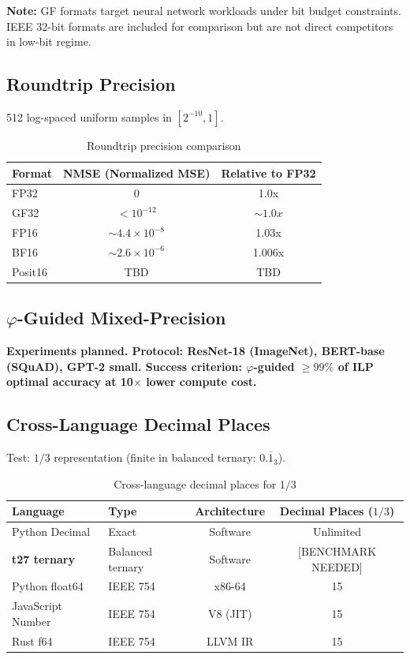 \documentclass{article}
\begin{document}
\textbf{Note:} GF formats target neural network workloads under bit budget constraints. IEEE 32-bit formats are included for comparison but are not direct competitors in low-bit regime.

\subsection{Roundtrip Precision}

512 log-spaced uniform samples in $[2^{-10}, 1]$.

\begin{table}[h]
\centering
\begin{tabular}{lcc}
\toprule
Format & NMSE (Normalized MSE) & Relative to FP32 \\
\midrule
FP32   & 0                    & 1.0x \\
GF32   & $< 10^{-12}$           & $\sim 1.0x$ \\
FP16   & $\sim 4.4 \times 10^{-8}$ & 1.03x \\
BF16   & $\sim 2.6 \times 10^{-6}$ & 1.006x \\
Posit16& TBD & TBD \\
\bottomrule
\end{tabular}
\caption{Roundtrip precision comparison}
\end{table}

\subsection{$\varphi$-Guided Mixed-Precision}

\textbf{Experiments planned. Protocol: ResNet-18 (ImageNet), BERT-base (SQuAD), GPT-2 small. Success criterion: $\varphi$-guided $\geq 99\%$ of ILP optimal accuracy at 10$\times$ lower compute cost.}

\subsection{Cross-Language Decimal Places}

Test: $1/3$ representation (finite in balanced ternary: $0.\overline{1}_3$).

\begin{table}[h]
\centering
\begin{tabular}{llcc}
\toprule
Language & Type & Architecture & Decimal Places ($1/3$) \\
\midrule
Python Decimal & Exact & Software & Unlimited \\
\textbf{t27 ternary} & Balanced ternary & Software & [BENCHMARK NEEDED] \\
Python float64 & IEEE 754 & x86-64 & 15 \\
JavaScript Number & IEEE 754 & V8 (JIT) & 15 \\
Rust f64 & IEEE 754 & LLVM IR & 15 \\
\bottomrule
\end{tabular}
\caption{Cross-language decimal places for $1/3$}
\end{table}
\end{document}
